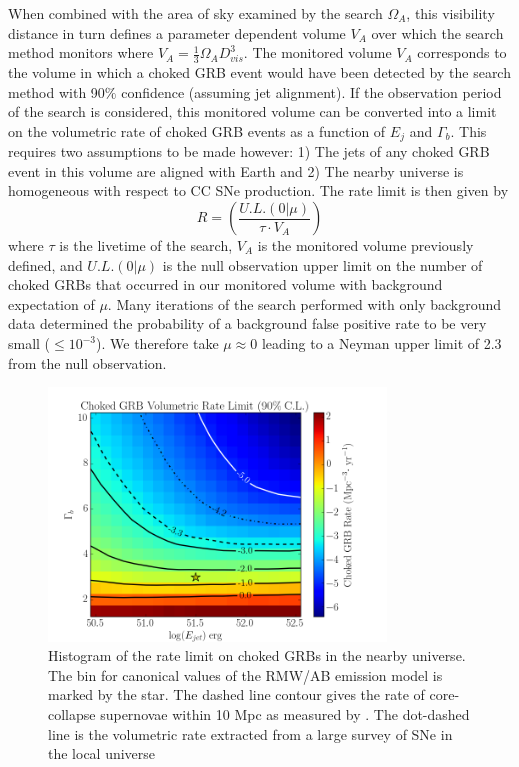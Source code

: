 \documentclass[manuscript]{aastex}
\begin{document}
When combined with the area of sky examined by the search $\Omega_{A}$, this visibility distance in turn defines a parameter dependent volume $V_A$ over which the search method monitors where $V_A=\frac{1}{3}\Omega_{A}D_{vis}^{3}$. The monitored volume $V_A$ corresponds to the volume in which a choked GRB event would have been detected by the search method with 90$\%$ confidence (assuming jet alignment). If the observation period of the search is considered, this monitored volume can be converted into a limit on the volumetric rate of choked GRB events as a function of $E_j$ and $\Gamma_b$. This requires two assumptions to be made however: 1) The jets of any choked GRB event in this volume are aligned with Earth and 2) The nearby universe is homogeneous with respect to CC SNe production. The rate limit is then given by
\begin{equation}\label{eq:ratelimit}
R = \left(\frac{U.L.(0|\mu)}{\tau \cdot V_A}\right)
\end{equation}
where $\tau$ is the livetime of the search, $V_A$ is the monitored volume previously defined, and $U.L.(0|\mu)$ is the null observation upper limit on the number of choked GRBs that occurred in our monitored volume with background expectation of $\mu$. Many iterations of the search performed with only background data determined the probability of a background false positive rate to be very small ($\leq 10^{-3}$). We therefore take $\mu\approx0$ leading to a Neyman upper limit of 2.3 from the null observation.
\begin{figure}[ht]
  \begin{center}
    \includegraphics[width=0.8\textwidth,keepaspectratio]{plots/RateLimit_2DHisto_wContours_SysAdjusted.png}
  \end{center}
  \caption[Choked GRB Volumetric Rate Limit]{Histogram of the rate limit on choked GRBs in the nearby universe. The bin for canonical values of the RMW/AB emission model is marked by the star. The dashed line contour gives the rate of core-collapse supernovae within 10 Mpc as measured by \cite{2011PhRvD..83l3008K}. The dot-dashed line is the volumetric rate extracted from a large survey of SNe in the local universe \citep{2011MNRAS.412.1419L}}
  \label{fig:VolumetricRateLimit}
\end{figure}
\end{document}
